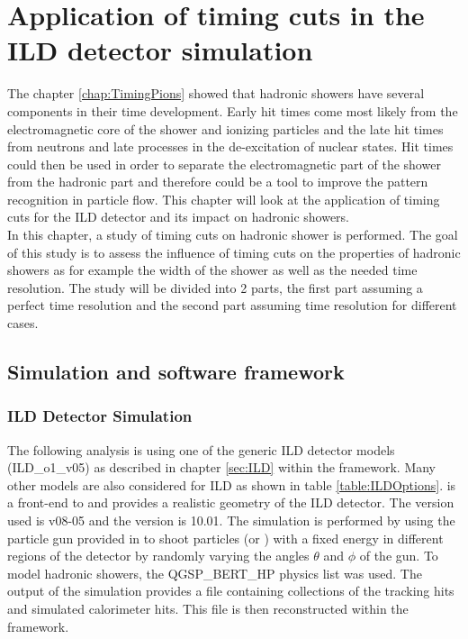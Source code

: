 \chapter{Application of timing cuts in the ILD detector simulation}
\label{chap:ILDTiming}

The chapter \ref{chap:TimingPions} showed that hadronic showers have several components in their time development. Early hit times come most likely from the electromagnetic core of the shower and ionizing particles and the late hit times from neutrons and late processes in the de-excitation of nuclear states. Hit times could then be used in order to separate the electromagnetic part of the shower from the hadronic part and therefore could be a tool to improve the pattern recognition in particle flow. This chapter will look at the application of timing cuts for the ILD detector and its impact on hadronic showers.\\

In this chapter, a study of timing cuts on hadronic shower is performed. The goal of this study is to assess the influence of timing cuts on the properties of hadronic showers as for example the width of the shower as well as the needed time resolution. The study will be divided into 2 parts, the first part assuming a perfect time resolution and the second part assuming time resolution for different cases.

\section{Simulation and software framework}

\subsection{ILD Detector Simulation}

The following analysis is using one of the generic ILD detector models (ILD\_o1\_v05) as described in chapter \ref{sec:ILD} within the \mokka framework. Many other models are also considered for ILD as shown in table \ref{table:ILDOptions}. \mokka is a front-end to \geant and provides a realistic geometry of the ILD detector. The \mokka version used is v08-05 and the \geant version is 10.01.
The simulation is performed by using the particle gun provided in \geant to shoot particles (\piminus or \kzeroL) with a fixed energy in different regions of the detector by randomly varying the angles $\theta$ and $\phi$ of the gun. To model hadronic showers, the QGSP\_BERT\_HP physics list was used. The output of the simulation provides a \lcio file containing collections of the tracking hits and simulated calorimeter hits. This file is then reconstructed within the \marlin framework.

